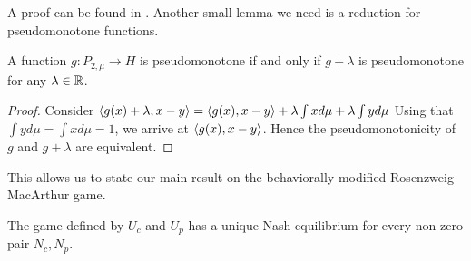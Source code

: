 A proof can be found in \citep[Proposition 2.8, p.96]{hadjisavvas2006handbook}.
Another small lemma we need is a reduction for pseudomonotone functions.
\begin{lemma}
  \label{lem:pseudo_reduc}
  A function $g: P_{2,\mu} \to H$ is pseudomonotone if and only if $g+\lambda$ is pseudomonotone for any $\lambda \in \mathbb{R}$.
\end{lemma}
\begin{proof}
  Consider $\left \langle g(x)+\lambda,x-y \right \rangle=\left \langle g(x),x-y \right \rangle+\lambda \int x d\mu + \lambda \int y d\mu$
  Using that $\int y d\mu = \int x d\mu = 1$, we arrive at  $\left \langle g(x),x-y \right \rangle$.
  Hence the pseudomonotonicity of $g$ and $g+\lambda$ are equivalent.
\end{proof}
This allows us to state our main result on the behaviorally modified Rosenzweig-MacArthur game.
\begin{proposition}
  \label{prop:exist_unique_nash}
  The game defined by $U_c$ and $U_p$ has a unique Nash equilibrium for every non-zero pair $N_c,N_p$.
\end{proposition}
